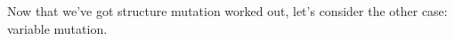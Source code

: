 \label{8_2_vars}

Now that we’ve got structure mutation worked out, let’s consider the other case:
variable mutation.

\secdown



\secup
